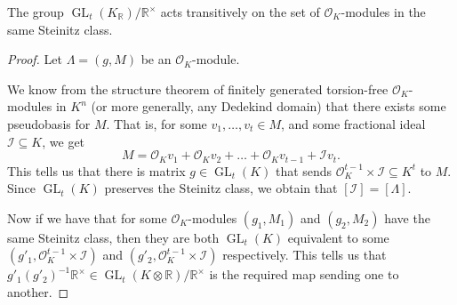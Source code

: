 \documentclass[10pt,a4paper]{amsart}
\DeclareMathOperator{\GL}{GL}
\newcommand{\OK}{\mathcal{O}_K}
\begin{document}
\begin{proposition}
\label{pr:trans_action}
The group $\GL_{t}(K_\mathbb{R})/\mathbb{R}^{\times}$ acts transitively on the set of $\OK$-modules in the same Steinitz class. 
\end{proposition}

\begin{proof} 

	Let $\Lambda = (g , M)$ be an $\OK$-module. 

	We know from the structure theorem of finitely generated torsion-free $\OK$-modules in $K^{n}$
	(or more generally, any Dedekind domain) that there exists some pseudobasis for $M$. That is,
	for some $v_1,\dots,v_t \in M $, and some fractional ideal $\mathcal{I}\subseteq K$,
	we get 
	\begin{equation}
	  M = \OK v_1 + \OK v_2 + \dots + \OK v_{t-1} + \mathcal{I} v_t.
	\end{equation}
	This tells us that there is matrix $g \in \GL_{t}(K)$ that sends $\OK^{t-1} \times \mathcal{I}\subseteq K^{t}$ 
	to $M$. Since $\GL_{t}(K)$ preserves the Steinitz class, 
	we obtain that $[\mathcal{I}] = [\Lambda]$.

	Now if we have that for some $\OK$-modules $(g_1, M_1)$ and $(g_2,M_2)$ have the same Steinitz class, then they are both $\GL_{t}(K)$ equivalent to some 
	$(g'_1, \OK^{t-1} \times \mathcal{I})$ and
	$(g'_2, \OK^{t-1} \times \mathcal{I})$ respectively. 
	This tells us that $g'_1 ( g'_2 )^{-1} \mathbb{R}^{\times} \in \GL_{t}(K \otimes \mathbb{R})/\mathbb{R}^{\times}$ is the required map sending one to another. 

	
	
\end{proof}
\end{document}
